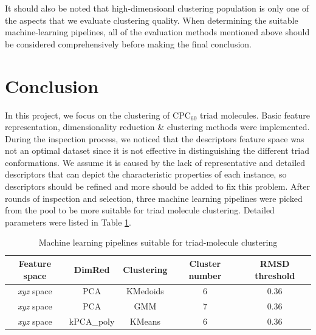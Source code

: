 \documentclass[a4paper]{article}
\begin{document}
It should also be noted that high-dimensioanl clustering population is only one of the aspects that we evaluate clustering quality. When determining the suitable machine-learning pipelines, all of the evaluation methods mentioned above should be considered comprehensively before making the final conclusion.

\pagebreak

\section{Conclusion}

In this project, we focus on the clustering of \(\text{CPC}_{60}\) triad molecules. Basic feature representation, dimensionality reduction \& clustering methods were implemented. During the inspection process, we noticed that the descriptors feature space was not an optimal dataset since it is not effective in distinguishing the different triad conformations. We assume it is caused by the lack of representative and detailed descriptors that can depict the characteristic properties of each instance, so descriptors should be refined and more should be added to fix this problem. After rounds of inspection and selection, three machine learning pipelines were picked from the pool to be more suitable for triad molecule clustering. Detailed parameters were listed in Table \ref{tab: final results}.

\begin{table}[H]
    \centering
    \caption{Machine learning pipelines suitable for triad-molecule clustering}
    \begin{tabular}{c|c|c|c|c}
    \hline \hline
        \textbf{Feature space} & \textbf{DimRed} & \textbf{Clustering} & \textbf{Cluster number} & \textbf{RMSD threshold} \\
        \hline
        \textit{xyz} space & PCA & KMedoids & 6 & 0.36 \\
        \textit{xyz} space & PCA & GMM & 7 & 0.36 \\
        \textit{xyz} space & kPCA\_poly & KMeans & 6 & 0.36 \\
        \hline \hline
    \end{tabular}
    \label{tab: final results}
\end{table}
\end{document}
